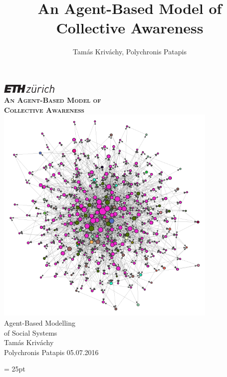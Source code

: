 \documentclass [12pt,a4paper,twoside]{article}
\title{An Agent-Based Model of Collective Awareness}
\author{Tamás Kriváchy, Polychronis Patapis}
\begin{document}




\begin{titlepage}
 \begin{center}
   \includegraphics[width=0.2\textwidth]{report/eth_logo_kurz_pos}\\[1cm]
   {\bf \textsc{\LARGE  An Agent-Based Model of \\[0.1cm] Collective Awareness}}\\[1cm]
   \includegraphics[width=0.8\textwidth]{report/graph}\\[0.1cm]
   {\huge Agent-Based Modelling \\ of Social Systems}\\[1.5cm]
   {\LARGE Tamás Kriváchy}\\
   \LARGE Polychronis Patapis
 \vfill 
 {\large 05.07.2016} \\
 
 \end{center}
\end{titlepage}



\newpage
\pagestyle{fancy}
  \fancyhead{}
  \headsep = 25pt
  \fancyhead[LE,RO]{\rightmark}
  \fancyhead[LO,RE]{\leftmark}
\end{document}

